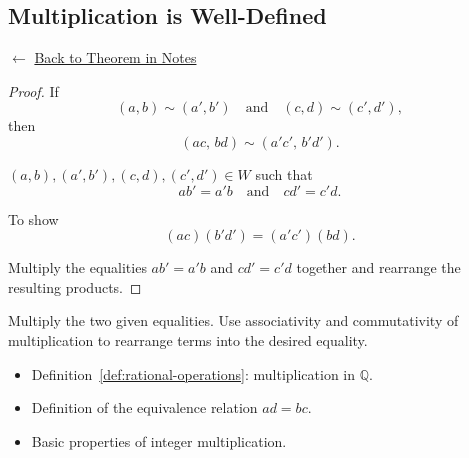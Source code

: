 
\subsection*{Multiplication is Well-Defined}
\label{prf:q-multiplication-well-defined}

\begin{remark*}[Return]
$\leftarrow$ \hyperref[thm:q-multiplication-well-defined]{Back to Theorem in Notes}
\end{remark*}

\begin{proof}

\Claim If
\[
(a,b) \sim (a',b')
\quad \text{and} \quad
(c,d) \sim (c',d'),
\]
then
\[
(ac,\,bd) \sim (a'c',\,b'd').
\]

\Given $(a,b),(a',b'),(c,d),(c',d') \in W$ such that
\[
ab' = a'b
\quad\text{and}\quad
cd' = c'd.
\]

\Goal To show
\[
(ac)(b'd') = (a'c')(bd).
\]

\Strategy
Multiply the equalities $ab' = a'b$ and $cd' = c'd$ together
and rearrange the resulting products.


\end{proof}

\begin{remark*}
Multiply the two given equalities.  
Use associativity and commutativity of multiplication to rearrange terms
into the desired equality.
\end{remark*}

\begin{remark*}[Dependencies]
\begin{itemize}
  \item Definition~\ref{def:rational-operations}: multiplication in $\mathbb{Q}$.
  \item Definition of the equivalence relation $ad = bc$.
  \item Basic properties of integer multiplication.
\end{itemize}
\end{remark*}